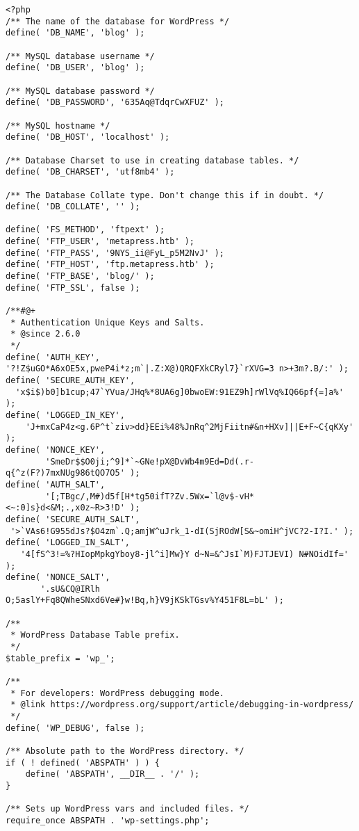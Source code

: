 \documentclass[11pt]{article}
\begin{document}
\begin{verbatim}
<?php
/** The name of the database for WordPress */
define( 'DB_NAME', 'blog' );

/** MySQL database username */
define( 'DB_USER', 'blog' );

/** MySQL database password */
define( 'DB_PASSWORD', '635Aq@TdqrCwXFUZ' );

/** MySQL hostname */
define( 'DB_HOST', 'localhost' );

/** Database Charset to use in creating database tables. */
define( 'DB_CHARSET', 'utf8mb4' );

/** The Database Collate type. Don't change this if in doubt. */
define( 'DB_COLLATE', '' );

define( 'FS_METHOD', 'ftpext' );
define( 'FTP_USER', 'metapress.htb' );
define( 'FTP_PASS', '9NYS_ii@FyL_p5M2NvJ' );
define( 'FTP_HOST', 'ftp.metapress.htb' );
define( 'FTP_BASE', 'blog/' );
define( 'FTP_SSL', false );

/**#@+
 * Authentication Unique Keys and Salts.
 * @since 2.6.0
 */
define( 'AUTH_KEY',
'?!Z$uGO*A6xOE5x,pweP4i*z;m`|.Z:X@)QRQFXkCRyl7}`rXVG=3 n>+3m?.B/:' );
define( 'SECURE_AUTH_KEY',
  'x$i$)b0]b1cup;47`YVua/JHq%*8UA6g]0bwoEW:91EZ9h]rWlVq%IQ66pf{=]a%' );
define( 'LOGGED_IN_KEY',
    'J+mxCaP4z<g.6P^t`ziv>dd}EEi%48%JnRq^2MjFiitn#&n+HXv]||E+F~C{qKXy' );
define( 'NONCE_KEY',
        'SmeDr$$O0ji;^9]*`~GNe!pX@DvWb4m9Ed=Dd(.r-q{^z(F?)7mxNUg986tQO7O5' );
define( 'AUTH_SALT',
        '[;TBgc/,M#)d5f[H*tg50ifT?Zv.5Wx=`l@v$-vH*<~:0]s}d<&M;.,x0z~R>3!D' );
define( 'SECURE_AUTH_SALT',
 '>`VAs6!G955dJs?$O4zm`.Q;amjW^uJrk_1-dI(SjROdW[S&~omiH^jVC?2-I?I.' );
define( 'LOGGED_IN_SALT',
   '4[fS^3!=%?HIopMpkgYboy8-jl^i]Mw}Y d~N=&^JsI`M)FJTJEVI) N#NOidIf=' );
define( 'NONCE_SALT',
       '.sU&CQ@IRlh O;5aslY+Fq8QWheSNxd6Ve#}w!Bq,h}V9jKSkTGsv%Y451F8L=bL' );

/**
 * WordPress Database Table prefix.
 */
$table_prefix = 'wp_';

/**
 * For developers: WordPress debugging mode.
 * @link https://wordpress.org/support/article/debugging-in-wordpress/
 */
define( 'WP_DEBUG', false );

/** Absolute path to the WordPress directory. */
if ( ! defined( 'ABSPATH' ) ) {
	define( 'ABSPATH', __DIR__ . '/' );
}

/** Sets up WordPress vars and included files. */
require_once ABSPATH . 'wp-settings.php';

\end{verbatim}
\end{document}
